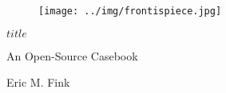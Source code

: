 \color{OffBlack}


{\clearpage}{}

\blankpage

\frontmatter

\thispagestyle{empty}

\begin{figure}
\centering
\texttt{[image: ../img/frontispiece.jpg]}
\end{figure}

\clearpage


\thispagestyle{empty}

\begin{flushright}

\vspace*{50mm}

{\bfseries\Huge{$title$}} 

{\bfseries\vspace{5mm}}

{\Large{An Open-Source Casebook}} 

\vspace{20mm}

{\normalsize{Eric M. Fink}} 

\vspace*{\fill}

\begin{small}



\rmfamily{\monthyear} 

\end{small}

\end{flushright}

\clearpage


\thispagestyle{empty}
\begingroup
\parindent 0pt
\vspace*{\fill}

\ccbyncsa

